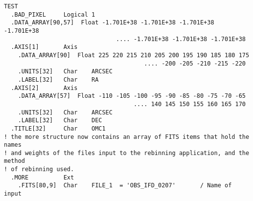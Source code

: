 \begin{small}
\begin{verbatim}
TEST
  .BAD_PIXEL     Logical 1
  .DATA_ARRAY[90,57]  Float -1.701E+38 -1.701E+38 -1.701E+38 -1.701E+38
                                .... -1.701E+38 -1.701E+38 -1.701E+38
  .AXIS[1]       Axis
    .DATA_ARRAY[90]  Float 225 220 215 210 205 200 195 190 185 180 175
                                        .... -200 -205 -210 -215 -220
    .UNITS[32]   Char    ARCSEC
    .LABEL[32]   Char    RA
  .AXIS[2]       Axis
    .DATA_ARRAY[57]  Float -110 -105 -100 -95 -90 -85 -80 -75 -70 -65
                                     .... 140 145 150 155 160 165 170
    .UNITS[32]   Char    ARCSEC
    .LABEL[32]   Char    DEC
  .TITLE[32]     Char    OMC1
! the more structure now contains an array of FITS items that hold the names
! and weights of the files input to the rebinning application, and the method
! of rebinning used.
  .MORE          Ext
    .FITS[80,9]  Char    FILE_1  = 'OBS_IFD_0207'       / Name of input
\end{verbatim}
\end{small}


